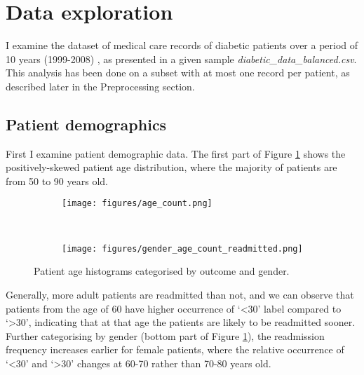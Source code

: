 \documentclass[10pt, twocolumn]{article}
\begin{document}
\thispagestyle{first}
\pagestyle{plain}


\section{Data exploration}

I examine the dataset of medical care records of diabetic patients over a period of 10 years (1999-2008) \cite{strack2014dataset}, as presented in a given sample \textit{diabetic\_data\_balanced.csv}. This analysis has been done on a subset with at most one record per patient, as described later in the Preprocessing section.

\subsection{Patient demographics}

First I examine patient demographic data. The first part of Figure \ref{genderagecountreadmitted} shows the positively-skewed patient age distribution, where the majority of patients are from 50 to 90 years old.

\begin{figure}[htb!]
	\centering
	\begin{subfigure}[t]{0.5\textwidth}
        \centering
        \texttt{[image: figures/age\_count.png]}
	\end{subfigure}
	~
	\begin{subfigure}[t]{0.5\textwidth}
        \centering
		\texttt{[image: figures/gender\_age\_count\_readmitted.png]}
    \end{subfigure}
	\caption{Patient age histograms categorised by outcome and gender.}\label{genderagecountreadmitted}
\end{figure}

Generally, more adult patients are readmitted than not, and we can observe that patients from the age of 60 have higher occurrence of `<30' label compared to `>30', indicating that at that age the patients are likely to be readmitted sooner. Further categorising by gender (bottom part of Figure \ref{genderagecountreadmitted}), the readmission frequency increases earlier for female patients, where the relative occurrence of `<30' and `>30' changes at 60-70 rather than 70-80 years old.
\end{document}
